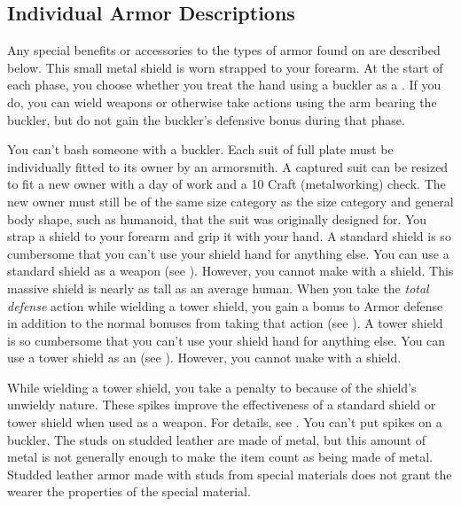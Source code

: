   \subsection{Individual Armor Descriptions}
    Any special benefits or accessories to the types of armor found on  are described below.
     This small metal shield is worn strapped to your forearm.
    At the start of each phase, you choose whether you treat the hand using a buckler as a .
    If you do, you can wield weapons or otherwise take actions using the arm bearing the buckler, but do not gain the buckler's defensive bonus during that phase.
    \par You can't bash someone with a buckler.
     Each suit of full plate must be individually fitted to its owner by an armorsmith.
    A captured suit can be resized to fit a new owner with a day of work and a  10 Craft (metalworking) check.
    The new owner must still be of the same size category as the size category and general body shape, such as humanoid, that the suit was originally designed for.
     You strap a shield to your forearm and grip it with your hand.
    A standard shield is so cumbersome that you can't use your shield hand for anything else.
    You can use a standard shield as a weapon (see ).
    However, you cannot make  with a shield.
     This massive shield is nearly as tall as an average human.
    When you take the \textit{total defense} action while wielding a tower shield, you gain a  bonus to Armor defense in addition to the normal bonuses from taking that action (see ).
    A tower shield is so cumbersome that you can't use your shield hand for anything else.
    You can use a tower shield as an  (see ).
    However, you cannot make  with a shield.

    While wielding a tower shield, you take a  penalty to  because of the shield's unwieldy nature.
     These spikes improve the effectiveness of a standard shield or tower shield when used as a weapon.
    For details, see .
    You can't put spikes on a buckler.
     The studs on studded leather are made of metal, but this amount of metal is not generally enough to make the item count as being made of metal.
    Studded leather armor made with studs from special materials does not grant the wearer the properties of the special material.

